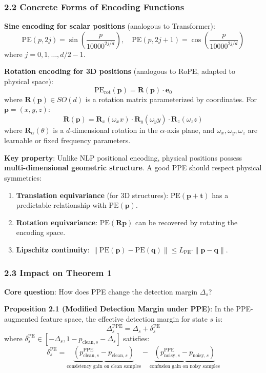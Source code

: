 \documentclass[
  12pt,
]{article}
\providecommand{\tightlist}{%
  \setlength{\itemsep}{0pt}\setlength{\parskip}{0pt}}
\begin{document}
\subsubsection{2.2 Concrete Forms of Encoding Functions}\label{encoding-function-forms}

\textbf{Sine encoding for scalar positions} (analogous to Transformer):
\[\text{PE}(p, 2j) = \sin\left(\frac{p}{10000^{2j/d}}\right), \quad \text{PE}(p, 2j+1) = \cos\left(\frac{p}{10000^{2j/d}}\right)\]
where $j = 0, 1, \ldots, d/2 - 1$.

\textbf{Rotation encoding for 3D positions} (analogous to RoPE, adapted to physical space):
\[\text{PE}_{\text{rot}}(\mathbf{p}) = \mathbf{R}(\mathbf{p}) \cdot \mathbf{e}_0\]
where $\mathbf{R}(\mathbf{p}) \in SO(d)$ is a rotation matrix parameterized by coordinates. For $\mathbf{p} = (x, y, z)$:
\[\mathbf{R}(\mathbf{p}) = \mathbf{R}_x(\omega_x x) \cdot \mathbf{R}_y(\omega_y y) \cdot \mathbf{R}_z(\omega_z z)\]
where $\mathbf{R}_\alpha(\theta)$ is a $d$-dimensional rotation in the $\alpha$-axis plane, and $\omega_x, \omega_y, \omega_z$ are learnable or fixed frequency parameters.

\textbf{Key property}: Unlike NLP positional encoding, physical positions possess \textbf{multi-dimensional geometric structure}. A good PPE should respect physical symmetries:

\begin{enumerate}
\def\labelenumi{\arabic{enumi}.}
\tightlist
\item
  \textbf{Translation equivariance} (for 3D structures): $\text{PE}(\mathbf{p} + \mathbf{t})$ has a predictable relationship with $\text{PE}(\mathbf{p})$.
\item
  \textbf{Rotation equivariance}: $\text{PE}(\mathbf{R}\mathbf{p})$ can be recovered by rotating the encoding space.
\item
  \textbf{Lipschitz continuity}: $\|\text{PE}(\mathbf{p}) - \text{PE}(\mathbf{q})\| \leq L_{\text{PE}} \cdot \|\mathbf{p} - \mathbf{q}\|$.
\end{enumerate}

\subsubsection{2.3 Impact on Theorem 1}\label{impact-on-theorem-1}

\textbf{Core question}: How does PPE change the detection margin $\Delta_s$?

\textbf{Proposition 2.1 (Modified Detection Margin under PPE)}: In the PPE-augmented feature space, the effective detection margin for state $s$ is:
\[\boxed{\Delta_s^{\text{PPE}} = \Delta_s + \delta_s^{\text{PE}}}\]
where $\delta_s^{\text{PE}} \in [-\Delta_s, 1 - p_{\text{clean},s} - \Delta_s]$ satisfies:
\[\delta_s^{\text{PE}} = \underbrace{(p_{\text{clean},s}^{\text{PPE}} - p_{\text{clean},s})}_{\text{consistency gain on clean samples}} - \underbrace{(p_{\text{noisy},s}^{\text{PPE}} - p_{\text{noisy},s})}_{\text{confusion gain on noisy samples}}\]
\end{document}
